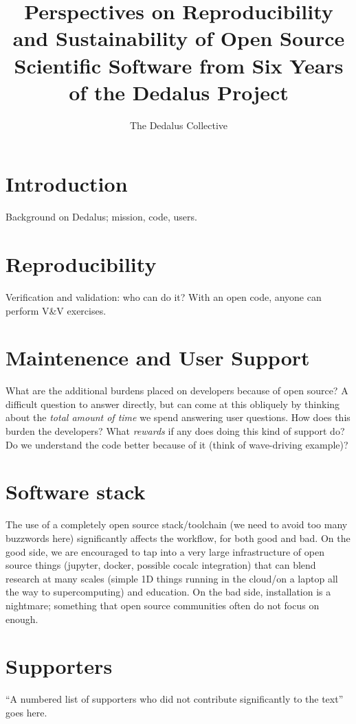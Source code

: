\documentclass{paper}
\title{Perspectives on Reproducibility and Sustainability of Open Source Scientific Software from Six Years of the Dedalus Project}
\author{The Dedalus Collective}
\begin{document}
\maketitle

\section{Introduction}
\label{sec:intro}

Background on Dedalus; mission, code, users.

\section{Reproducibility}
\label{sec:repro}

Verification and validation: who can do it? With an open code, anyone can perform V\&V exercises. 

\section{Maintenence and User Support}
\label{sec:support}

What are the additional burdens placed on developers because of open source? A difficult question to answer directly, but can come at this obliquely by thinking about the \emph{total amount of time} we spend answering user questions. How does this burden the developers? What \emph{rewards} if any does doing this kind of support do? Do we understand the code better because of it (think of wave-driving example)? 

\section{Software stack}
\label{sec:stack}

The use of a completely open source stack/toolchain (we need to avoid too many buzzwords here) significantly affects the workflow, for both good and bad. On the good side, we are encouraged to tap into a very large infrastructure of open source things (jupyter, docker, possible cocalc integration) that can blend research at many scales (simple 1D things running in the cloud/on a laptop all the way to supercomputing) and education. On the bad side, installation is a nightmare; something that open source communities often do not focus on enough.

\appendix

\section{Supporters}
\label{sec:supporters}

``A numbered list of supporters who did not contribute significantly to the text'' goes here.
\end{document}
